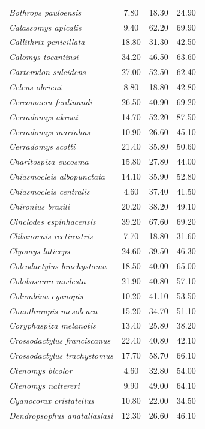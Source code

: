 \documentclass[12pt,openright,oneside,a4paper,english]{abntex2}
\begin{document}
\begin{longtable}{lccc}
	\textit{Bothrops pauloensis}&7.80 &18.30 &24.90 \\
	\textit{Calassomys apicalis}&9.40 &62.20 &69.90 \\
	\textit{Callithrix penicillata}&18.80 &31.30 &42.50 \\
	\textit{Calomys tocantinsi}&34.20 &46.50 &63.60 \\
	\textit{Carterodon sulcidens}&27.00 &52.50 &62.40 \\
	\textit{Celeus obrieni}&8.80 &18.80 &42.80 \\
	\textit{Cercomacra ferdinandi}&26.50 &40.90 &69.20 \\
	\textit{Cerradomys akroai}&14.70 &52.20 &87.50 \\
	\textit{Cerradomys marinhus}&10.90 &26.60 &45.10 \\
	\textit{Cerradomys scotti}&21.40 &35.80 &50.60 \\
	\textit{Charitospiza eucosma}&15.80 &27.80 &44.00 \\
	\textit{Chiasmocleis albopunctata}&14.10 &35.90 &52.80 \\
	\textit{Chiasmocleis centralis}&4.60 &37.40 &41.50 \\
	\textit{Chironius brazili}&20.20 &38.20 &49.10 \\
	\textit{Cinclodes espinhacensis}&39.20 &67.60 &69.20 \\
	\textit{Clibanornis rectirostris}&7.70 &18.80 &31.60 \\
	\textit{Clyomys laticeps}&24.60 &39.50 &46.30 \\
	\textit{Coleodactylus brachystoma}&18.50 &40.00 &65.00 \\
	\textit{Colobosaura modesta}&21.90 &40.80 &57.10 \\
	\textit{Columbina cyanopis}&10.20 &41.10 &53.50 \\
	\textit{Conothraupis mesoleuca}&15.20 &34.70 &51.10 \\
	\textit{Coryphaspiza melanotis}&13.40 &25.80 &38.20 \\
	\textit{Crossodactylus franciscanus}&22.40 &40.80 &42.10 \\
	\textit{Crossodactylus trachystomus}&17.70 &58.70 &66.10 \\
	\textit{Ctenomys bicolor}&4.60 &32.80 &54.00 \\
	\textit{Ctenomys nattereri}&9.90 &49.00 &64.10 \\
	\textit{Cyanocorax cristatellus}&10.80 &22.00 &34.50 \\
	\textit{Dendropsophus anataliasiasi}&12.30 &26.60 &46.10 \\

\end{longtable}
\end{document}
